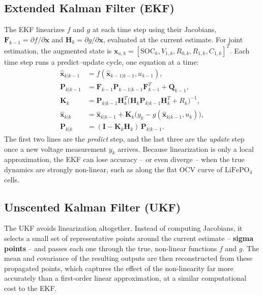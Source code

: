 \subsection{Extended Kalman Filter (EKF)}
\label{subsec:ekf_details}

The EKF linearizes $f$ and $g$ at each time step using their Jacobians, $\mathbf{F}_{k-1} = \partial f/\partial \mathbf{x}$ and $\mathbf{H}_k = \partial g/\partial \mathbf{x}$, evaluated at the current estimate. For joint estimation, the augmented state is $\mathbf{x}_{a,k} = [\text{SOC}_k, V_{1,k}, R_{0,k}, R_{1,k}, C_{1,k}]^T$. Each time step runs a predict--update cycle, one equation at a time:
\begin{align}
\hat{\mathbf{x}}_{k|k-1} &= f(\hat{\mathbf{x}}_{k-1|k-1}, u_{k-1}), \label{eq:ekf_predict_x}\\
\mathbf{P}_{k|k-1} &= \mathbf{F}_{k-1} \mathbf{P}_{k-1|k-1} \mathbf{F}_{k-1}^T + \mathbf{Q}_{k-1}, \label{eq:ekf_predict_p}\\
\mathbf{K}_k &= \mathbf{P}_{k|k-1} \mathbf{H}_k^T \big(\mathbf{H}_k \mathbf{P}_{k|k-1} \mathbf{H}_k^T + R_k\big)^{-1}, \label{eq:ekf_gain}\\
\hat{\mathbf{x}}_{k|k} &= \hat{\mathbf{x}}_{k|k-1} + \mathbf{K}_k\big(y_k - g(\hat{\mathbf{x}}_{k|k-1}, u_k)\big), \label{eq:ekf_update_x}\\
\mathbf{P}_{k|k} &= (\mathbf{I} - \mathbf{K}_k \mathbf{H}_k)\, \mathbf{P}_{k|k-1}. \label{eq:ekf_update_p}
\end{align}
The first two lines are the \emph{predict} step, and the last three are the \emph{update} step once a new voltage measurement $y_k$ arrives. Because linearization is only a local approximation, the EKF can lose accuracy -- or even diverge -- when the true dynamics are strongly non-linear, such as along the flat OCV curve of $\text{LiFePO}_4$ cells.

\subsection{Unscented Kalman Filter (UKF)}
\label{subsec:ukf_details}

The UKF avoids linearization altogether. Instead of computing Jacobians, it selects a small set of representative points around the current estimate -- \textbf{sigma points} -- and passes each one through the true, non-linear functions $f$ and $g$. The mean and covariance of the resulting outputs are then reconstructed from these propagated points, which captures the effect of the non-linearity far more accurately than a first-order linear approximation, at a similar computational cost to the EKF.

